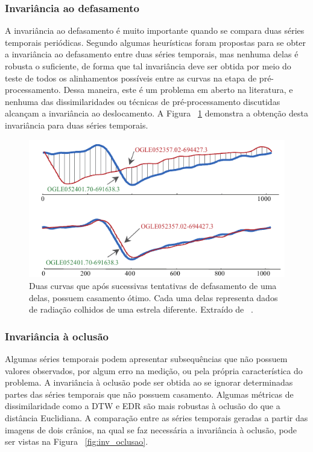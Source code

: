 \subsubsection{Invariância ao defasamento}

A invariância ao defasamento é muito importante quando se compara duas séries temporais periódicas. Segundo \parencite{CID} algumas heurísticas foram propostas para se obter a invariância ao defasamento entre duas séries temporais, mas nenhuma delas é robusta o suficiente, de forma que tal invariância deve ser obtida por meio do teste de todos os alinhamentos possíveis entre as curvas na etapa de pré-processamento. Dessa maneira, este é um problema em aberto na literatura, e nenhuma das dissimilaridades ou técnicas de pré-processamento discutidas alcançam a invariância ao deslocamento. A Figura ~\ref{fig:inv_defasamento} demonstra a obtenção desta invariância para duas séries temporais.

\begin{figure}[h!]
	\includegraphics[width=\linewidth]{figuras/invariancias/defasamento.png}
	\caption{Duas curvas que após sucessivas tentativas de defasamento de uma delas, possuem casamento ótimo. Cada uma delas representa dados de radiação colhidos de uma estrela diferente. Extraído de ~\parencite{CID}.}
	\label{fig:inv_defasamento}
\end{figure}

\subsubsection{Invariância à oclusão}

Algumas séries temporais podem apresentar subsequências que não possuem valores observados, por algum erro na medição, ou pela própria característica do problema. A invariância à oclusão pode ser obtida ao se ignorar determinadas partes das séries temporais que não possuem casamento. Algumas métricas de dissimilaridade como a DTW e EDR são mais robustas à oclusão do que a distância Euclidiana. A comparação entre as séries temporais geradas a partir das imagens de dois crânios, na qual se faz necessária a invariância à oclusão, pode ser vistas na Figura ~\ref{fig:inv_oclusao}.

